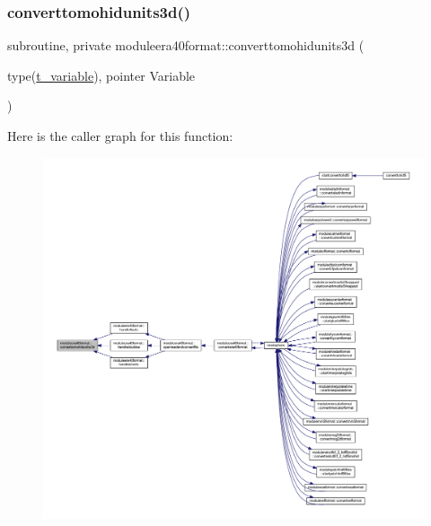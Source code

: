 \mbox{\label{namespacemoduleera40format_a407d38960a0ddf8b9d1645d26d35d49b}} 
\subsubsection{\texorpdfstring{converttomohidunits3d()}{converttomohidunits3d()}}
{\footnotesize\ttfamily subroutine, private moduleera40format\+::converttomohidunits3d (\begin{DoxyParamCaption}\item[{type(\mbox{\hyperlink{structmoduleera40format_1_1t__variable}{t\+\_\+variable}}), pointer}]{Variable }\end{DoxyParamCaption})\hspace{0.3cm}{\ttfamily [private]}}

Here is the caller graph for this function\+:\nopagebreak
\begin{figure}[H]
\begin{center}
\leavevmode
\includegraphics[width=350pt]{namespacemoduleera40format_a407d38960a0ddf8b9d1645d26d35d49b_icgraph}
\end{center}
\end{figure}
\mbox{\label{namespacemoduleera40format_ad2e0367ac675a7a629eb4baf66bcf7c6}} 
